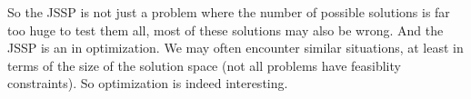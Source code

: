 So the \gls{JSSP} is not just a problem where the number of possible solutions is far too huge to test them all, most of these solutions may also be wrong.
And the \gls{JSSP} is an  in optimization.
We may often encounter similar situations, at least in terms of the size of the solution space (not all problems have feasiblity constraints).
So optimization is indeed interesting.%
\endhsection%
\endhsection%

